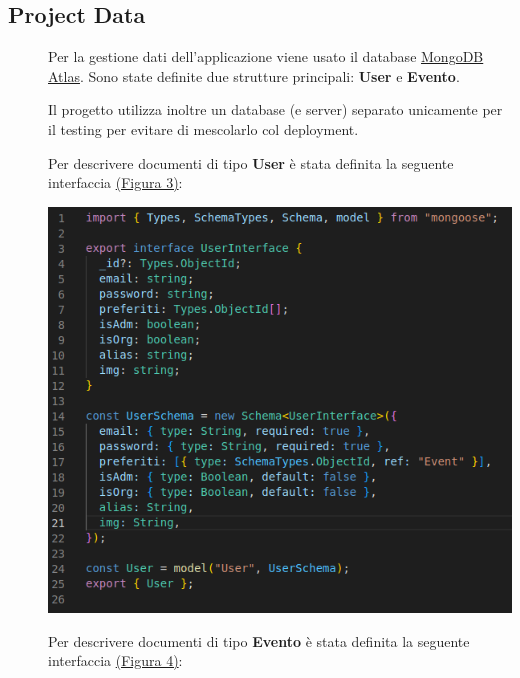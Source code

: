 \documentclass{article}
\begin{document}
\subsection{Project Data}
\begin{description}
    \item[] Per la gestione dati dell'applicazione viene usato il database \href{https://www.mongodb.com/atlas}{MongoDB Atlas}. Sono state definite due strutture principali: \textbf{User} e \textbf{Evento}.
    \item[] Il progetto utilizza inoltre un database (e server) separato unicamente per il testing per evitare di mescolarlo col deployment.
    \item[] Per descrivere documenti di tipo \textbf{User} è stata definita la seguente interfaccia \hyperref[img:3]{(Figura 3)}:
    \item[] \label{img:3} \begin{center}
            \includegraphics[scale=0.5]{UserInterface.png}
        \end{center}
        \clearpage
    \item[] Per descrivere documenti di tipo \textbf{Evento} è stata definita la seguente interfaccia \hyperref[img:4]{(Figura 4)}:
    \item[] \label{img:4} \begin{center}

\end{center}
\end{description}
\end{document}

